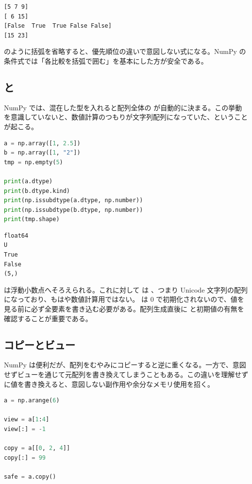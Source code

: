 \begin{lstlisting}[numbers=none, xleftmargin=2\zw]
[5 7 9]
[ 6 15]
[False  True  True False False]
[15 23]
\end{lstlisting}

 のように括弧を省略すると、優先順位の違いで意図しない式になる。NumPy の条件式では「各比較を括弧で囲む」を基本にした方が安全である。

\subsection{ と }

NumPy では、混在した型を入れると配列全体の  が自動的に決まる。この挙動を意識していないと、数値計算のつもりが文字列配列になっていた、ということが起こる。

\begin{lstlisting}[language=Python]
a = np.array([1, 2.5])
b = np.array([1, "2"])
tmp = np.empty(5)

print(a.dtype)
print(b.dtype.kind)
print(np.issubdtype(a.dtype, np.number))
print(np.issubdtype(b.dtype, np.number))
print(tmp.shape)
\end{lstlisting}

\begin{lstlisting}[numbers=none, xleftmargin=2\zw]
float64
U
True
False
(5,)
\end{lstlisting}

 は浮動小数点へそろえられる。これに対して  は 、つまり Unicode 文字列の配列になっており、もはや数値計算用ではない。 は 0 で初期化されないので、値を見る前に必ず全要素を書き込む必要がある。配列生成直後に  と初期値の有無を確認することが重要である。

\subsection{コピーとビュー}

NumPy は便利だが、配列をむやみにコピーすると逆に重くなる。一方で、意図せずビューを通じて元配列を書き換えてしまうこともある。この違いを理解せずに値を書き換えると、意図しない副作用や余分なメモリ使用を招く。

\begin{lstlisting}[language=Python]
a = np.arange(6)

view = a[1:4]
view[:] = -1

copy = a[[0, 2, 4]]
copy[:] = 99

safe = a.copy()
\end{lstlisting}

